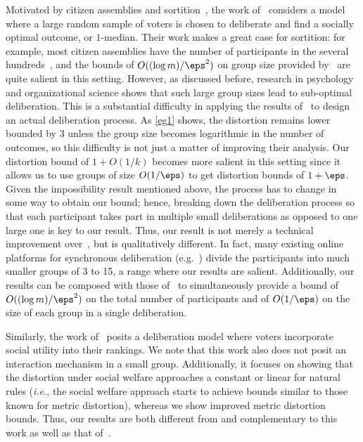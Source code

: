 Motivated by citizen assemblies and sortition~\cite{Ingham18,fishkin1991democracy}, the work of~\cite{CaragiannisM024} considers a model where a large random sample of voters is chosen to deliberate and find a socially optimal outcome, or $1$-median. %
Their work makes a great case for sortition: for example, most citizen assemblies have the number of participants in the several hundreds~\cite{warren2008designing, dryzek2011toward}, and the bounds of $O((\log m)/\eps^2)$ on group size provided by~\cite{CaragiannisM024} are quite salient in this setting. However, as discussed before, research in psychology and organizational science shows that such large group sizes lead to sub-optimal deliberation. This is a substantial difficulty in applying the results of~\cite{CaragiannisM024} to design an actual deliberation process. As \cref{eg1} shows, the distortion remains lower bounded by $3$ unless the group size becomes logarithmic in the number of outcomes, so this difficulty is not just a matter of improving their analysis. Our distortion bound of $1 + O(1/k)$ becomes more salient in this setting since it allows us to use groups of size $O(1/\eps)$ to get distortion bounds of $1+\eps$. Given the impossibility result mentioned above, the process has to change in some way to obtain our bound; hence, breaking down the deliberation process so that each participant takes part in multiple small deliberations as opposed to one large one is key to our result. Thus, our result is not merely a technical improvement over~\cite{CaragiannisM024}, but is qualitatively different. In fact, many existing online platforms for synchronous deliberation (e.g.~\cite{stanfordd, myjunto, mismatch}) divide the participants into much smaller groups of 3 to 15, a range where our results are salient. Additionally, our results can be composed with those of~\cite{CaragiannisM024} to simultaneously provide a bound of $O((\log m)/\eps^2)$ on the total number of participants and of $O(1/\eps)$ on the size of each group in a single deliberation. 

Similarly, the work of~\cite{FlaniganPW23} posits a deliberation model where voters incorporate social utility into their rankings. We note that this work also does not posit an interaction mechanism in a small group. Additionally, it focuses on showing that the distortion under social welfare approaches a constant or linear for natural rules ({\em i.e.}, the social welfare approach starts to achieve bounds similar to those known for metric distortion), whereas we show improved metric distortion bounds. Thus, our results are both different from and complementary to this work as well as that of~\cite{CaragiannisM024}.


